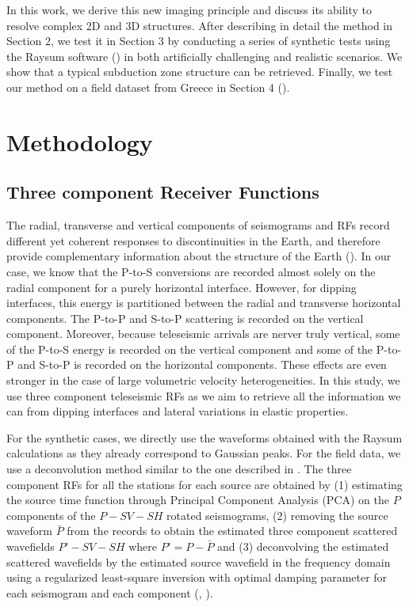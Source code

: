 \documentclass[10pt,a4paper]{article}
\numberwithin{equation}{section}
\DeclareRobustCommand{\rq}[1]{{\sethlcolor{myblue}\hl{#1}}}
\begin{document}
In this work, we derive this new imaging principle and discuss its ability to resolve complex 2D and 3D structures.
After describing in detail the method in Section 2, we test it in Section 3 by conducting a series of synthetic tests using the Raysum software (\cite{fred_gji_00}) in both artificially challenging and realistic scenarios.
We show that a typical subduction zone structure can be retrieved.
Finally, we test our method on a field dataset from Greece in Section 4 (\cite{pear_jgr_12}).

\section{Methodology}

\subsection{Three component Receiver Functions}

The radial, transverse and vertical components of seismograms and RFs record different yet coherent responses to discontinuities in the Earth, and therefore provide complementary information about the structure of the Earth (\cite{tone_epsl_08}).
In our case, we know that the P-to-S conversions are recorded almost solely on the radial component for a purely horizontal interface.
However, for dipping interfaces, this energy is partitioned between the radial and transverse horizontal components.
The P-to-P and S-to-P scattering is recorded on the vertical component.
Moreover, because teleseismic arrivals are nerver truly vertical, some of the P-to-S energy is recorded on the vertical component and some of the P-to-P and S-to-P is recorded on the horizontal components.
These effects are even stronger in the case of large volumetric velocity heterogeneities.
In this study, we use three component teleseismic RFs as we aim to retrieve all the information we can from dipping interfaces and lateral variations in elastic properties.

For the synthetic cases, we directly use the waveforms obtained with the Raysum calculations as they already correspond to Gaussian peaks.
For the field data, we use a deconvolution method similar to the one described in \cite{rond_sgeo_09}.
The three component RFs for all the stations for each source are obtained by (1) estimating the source time function through Principal Component Analysis (PCA) on the $P$ components of the $P-SV-SH$ rotated seismograms, (2) removing the source waveform $\bar{P}$ from the records to obtain the estimated three component scattered wavefields $P’-SV-SH$ where $P’=P-\bar{P}$ and (3) deconvolving the estimated scattered wavefields by the estimated source wavefield in the frequency domain using a regularized least-square inversion with optimal damping parameter for each seismogram and each component (\cite{pear_jgr_12}, \cite{bost_gji_99}).
\end{document}
